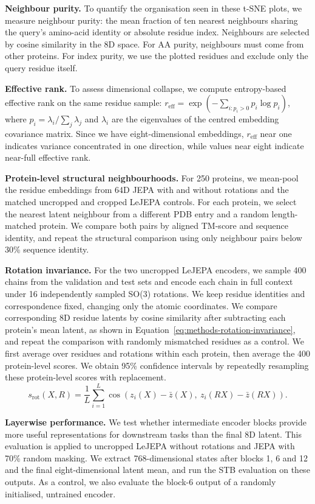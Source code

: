 \textbf{Neighbour purity.} To quantify the organisation seen in these t-SNE plots, we measure neighbour purity: the mean fraction of ten nearest neighbours sharing the query's amino-acid identity or absolute residue index. Neighbours are selected by cosine similarity in the 8D space. For AA purity, neighbours must come from other proteins. For index purity, we use the plotted residues and exclude only the query residue itself.

\textbf{Effective rank.} To assess dimensional collapse, we compute entropy-based effective rank \citep{roy2007effective} on the same residue sample: $r_{\mathrm{eff}}=\exp(-\sum_{i:p_i>0}p_i\log p_i)$, where $p_i=\lambda_i/\sum_j\lambda_j$ and $\lambda_i$ are the eigenvalues of the centred embedding covariance matrix. Since we have eight-dimensional embeddings, $r_{\mathrm{eff}}$ near one indicates variance concentrated in one direction, while values near eight indicate near-full effective rank.

\textbf{Protein-level structural neighbourhoods.} For 250 proteins, we mean-pool the residue embeddings from 64D JEPA with and without rotations and the matched uncropped and cropped LeJEPA controls. For each protein, we select the nearest latent neighbour from a different PDB entry and a random length-matched protein. We compare both pairs by aligned TM-score and sequence identity, and repeat the structural comparison using only neighbour pairs below 30\% sequence identity.

\textbf{Rotation invariance.} For the two uncropped LeJEPA encoders, we sample 400 chains from the validation and test sets and encode each chain in full context under 16 independently sampled SO(3) rotations. We keep residue identities and correspondence fixed, changing only the atomic coordinates. We compare corresponding 8D residue latents by cosine similarity after subtracting each protein's mean latent, as shown in Equation~\ref{eq:methods-rotation-invariance}, and repeat the comparison with randomly mismatched residues as a control. We first average over residues and rotations within each protein, then average the 400 protein-level scores. We obtain 95\% confidence intervals by repeatedly resampling these protein-level scores with replacement.
\begin{equation}
s_{\mathrm{rot}}(X,R)=\frac{1}{L}\sum_{i=1}^{L}\cos\!\left(z_i(X)-\bar z(X),\ z_i(RX)-\bar z(RX)\right).
\label{eq:methods-rotation-invariance}
\end{equation}

\textbf{Layerwise performance.} We test whether intermediate encoder blocks provide more useful representations for downstream tasks than the final 8D latent. This evaluation is applied to uncropped LeJEPA without rotations and JEPA with 70\% random masking. We extract 768-dimensional states after blocks 1, 6 and 12 and the final eight-dimensional latent mean, and run the STB evaluation on these outputs. As a control, we also evaluate the block-6 output of a randomly initialised, untrained encoder.
